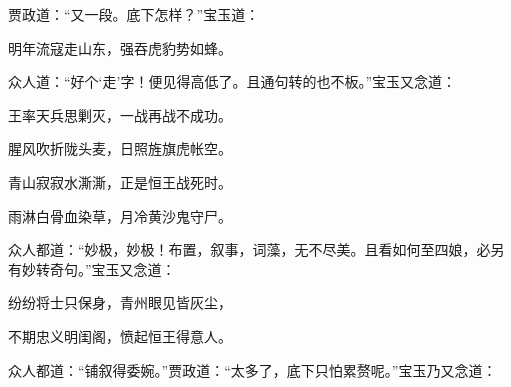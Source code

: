 \begin{parag}
    贾政道：“又一段。底下怎样？”宝玉道：
\end{parag}


\begin{poem}
    \begin{pl}
        明年流寇走山东，强吞虎豹势如蜂。
    \end{pl}
\end{poem}


\begin{parag}
    众人道：“好个‘走’字！便见得高低了。且通句转的也不板。”宝玉又念道：
\end{parag}
\begin{poem}
    \begin{pl}
        王率天兵思剿灭，一战再战不成功。
    \end{pl}
    \begin{pl}
        腥风吹折陇头麦，日照旌旗虎帐空。
    \end{pl}
    \begin{pl}
        青山寂寂水澌澌，正是恒王战死时。
    \end{pl}
    \begin{pl}
        雨淋白骨血染草，月冷黄沙鬼守尸。
    \end{pl}
\end{poem}


\begin{parag}
    众人都道：“妙极，妙极！布置，叙事，词藻，无不尽美。且看如何至四娘，必另有妙转奇句。”宝玉又念道：
\end{parag}


\begin{poem}
    \begin{pl}
        纷纷将士只保身，青州眼见皆灰尘，
    \end{pl}
    \begin{pl}
        不期忠义明闺阁，愤起恒王得意人。
    \end{pl}
\end{poem}


\begin{parag}
    众人都道：“铺叙得委婉。”贾政道：“太多了，底下只怕累赘呢。”宝玉乃又念道：
\end{parag}


